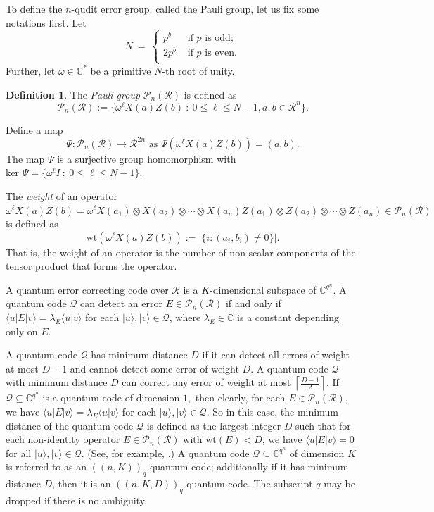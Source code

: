 \documentclass{article}
\theoremstyle{remark}
\theoremstyle{definition}
\newtheorem{defin}{Definition}[section]
\numberwithin{equation}{section}
\begin{document}
To define the $n$-qudit error group, called the Pauli group, let us fix some notations first.
 Let \begin{equation*} N~=~\left\{\begin{array}{ll}
p^b & \text{ if~} p \text{~is odd} ;\\
2p^b & \text{ if~} p \text{~is even}.\\
\end{array}\right. \end{equation*}
Further, let $\omega \in \mathbb{C}^*$ be a primitive $N$-th root of unity.
\begin{defin} \cite{luerssen}  The \emph{Pauli group} $\mathcal{P}_n(\mathcal{R})$ is defined as 
$$\mathcal{P}_n(\mathcal{R}) := \{\omega^\ell X(a)Z(b) ~:~ 0 \leq \ell \leq N-1, a, b \in \mathcal{R}^n\}.$$ 
\label{def:Pauli}
\end{defin}
 Define a map $$\Psi : \mathcal{P}_n(\mathcal{R}) \to \mathcal{R}^{2n} \text{~as~} \Psi(\omega^\ell X(a)Z(b))=(a,b).$$ The map $\Psi$ is a surjective group homomorphism with $\text{ker~}\Psi =\{\omega^\ell I ~:~ 0 \leq\ell \leq N-1 \}.$
 
 The \emph{weight} of an operator $\omega^\ell X(a)Z(b)=\omega^\ell X(a_1)\otimes X(a_2)\otimes \cdots\otimes X(a_n)Z(a_1)\otimes Z(a_2)\otimes \cdots\otimes Z(a_n) \in \mathcal{P}_n(\mathcal{R})$ is defined as 
 $$\text{wt}(\omega^\ell X(a)Z(b)):=|\{ i : (a_i,b_i) \neq 0\}|.$$
 That is, the weight of an operator is the number of non-scalar components of the tensor product that forms the operator.
 
A quantum error correcting code over $\mathcal{R}$ is a $K$-dimensional subspace of $\mathbb{C}^{q^n}.$
A quantum code $\mathcal{Q}$ can detect an error $E \in \mathcal{P}_n(\mathcal{R})$ if and only if  $\langle u| E |v \rangle=\lambda_E\langle u | v \rangle$ for each $|u \rangle,|v \rangle \in \mathcal{Q}$, where $\lambda_E \in \mathbb{C}$ is a constant depending only on $E$.


 A quantum code $\mathcal{Q}$ has minimum distance $D$ if it can detect all errors of weight at most $D-1$ and cannot detect some error of weight $D$. A quantum code $\mathcal{Q}$ with minimum distance $D$ can correct any error of weight  at most  $\left\lceil \frac{D-1}{2}\right\rceil$. If $\mathcal{Q} \subseteq \mathbb{C}^{q^n}$ is a quantum code  of dimension $1,$ then clearly, for each  $E \in \mathcal{P}_n(\mathcal{R}),$ we have $\langle u | E | v \rangle=\lambda_E\langle u | v \rangle$ for each $|u \rangle,|v \rangle \in \mathcal{Q}.$ So in this case, the minimum distance of the quantum code $\mathcal{Q}$ is defined as the largest integer $D$ such that for each non-identity operator $E \in \mathcal{P}_n(\mathcal{R})$ with $\text{wt}(E) < D$, we have $\langle u | E | v \rangle=0$ for all $|u \rangle,|v \rangle \in \mathcal{Q}$. (See, for example, \cite{DG04}.) A quantum code $\mathcal{Q} \subseteq \mathbb{C}^{q^n}$ of dimension $K$ is referred to as an $((n,K))_q$ quantum code; additionally if it has minimum distance $D$, then it is an $((n,K,D))_q$ quantum code. The subscript $q$ may be dropped if there is no ambiguity. 
 
\end{document}
